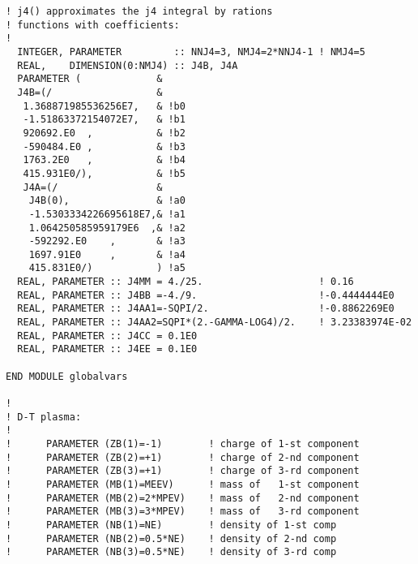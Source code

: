 \documentclass[preprint,12pt,eqsecnum,nofootinbib,amsmath,amssymb]{revtex4}
\begin{document}
{\begin{verbatim}
! j4() approximates the j4 integral by rations
! functions with coefficients:
!
  INTEGER, PARAMETER         :: NNJ4=3, NMJ4=2*NNJ4-1 ! NMJ4=5
  REAL,    DIMENSION(0:NMJ4) :: J4B, J4A
  PARAMETER (             &
  J4B=(/                  &
   1.368871985536256E7,   & !b0
   -1.51863372154072E7,   & !b1
   920692.E0  ,           & !b2
   -590484.E0 ,           & !b3
   1763.2E0   ,           & !b4
   415.931E0/),           & !b5
   J4A=(/                 &
    J4B(0),               & !a0
    -1.5303334226695618E7,& !a1
    1.064250585959179E6  ,& !a2
    -592292.E0    ,       & !a3
    1697.91E0     ,       & !a4
    415.831E0/)           ) !a5
  REAL, PARAMETER :: J4MM = 4./25.                    ! 0.16 
  REAL, PARAMETER :: J4BB =-4./9.                     !-0.4444444E0
  REAL, PARAMETER :: J4AA1=-SQPI/2.                   !-0.8862269E0  
  REAL, PARAMETER :: J4AA2=SQPI*(2.-GAMMA-LOG4)/2.    ! 3.23383974E-02 
  REAL, PARAMETER :: J4CC = 0.1E0
  REAL, PARAMETER :: J4EE = 0.1E0 

END MODULE globalvars

!
! D-T plasma:
!
!      PARAMETER (ZB(1)=-1)        ! charge of 1-st component
!      PARAMETER (ZB(2)=+1)        ! charge of 2-nd component
!      PARAMETER (ZB(3)=+1)        ! charge of 3-rd component
!      PARAMETER (MB(1)=MEEV)      ! mass of   1-st component
!      PARAMETER (MB(2)=2*MPEV)    ! mass of   2-nd component
!      PARAMETER (MB(3)=3*MPEV)    ! mass of   3-rd component
!      PARAMETER (NB(1)=NE)        ! density of 1-st comp
!      PARAMETER (NB(2)=0.5*NE)    ! density of 2-nd comp
!      PARAMETER (NB(3)=0.5*NE)    ! density of 3-rd comp
\end{verbatim}
}
\end{document}
